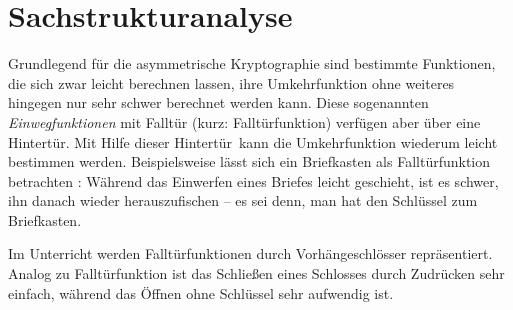 \section{Sachstrukturanalyse}
Grundlegend für die asymmetrische Kryptographie sind bestimmte Funktionen, die sich zwar leicht berechnen lassen, ihre Umkehrfunktion ohne weiteres hingegen nur sehr schwer berechnet werden kann. Diese sogenannten \textit{Einwegfunktionen} mit Falltür (kurz: Falltürfunktion) verfügen aber über eine \glqq Hintertür\grqq  . Mit Hilfe dieser \glqq Hintertür\grqq\ kann die Umkehrfunktion wiederum leicht bestimmen werden. Beispielsweise lässt sich ein Briefkasten als Falltürfunktion betrachten \parencite[vgl.][11]{gramm_2011}: Während das Einwerfen eines Briefes leicht geschieht, ist es schwer, ihn danach wieder herauszufischen – es sei denn, man hat den Schlüssel zum Briefkasten. 

Im Unterricht werden Falltürfunktionen durch Vorhängeschlösser repräsentiert. Analog zu Falltürfunktion ist das Schließen eines Schlosses durch Zudrücken sehr einfach, während das Öffnen ohne Schlüssel sehr aufwendig ist.  

